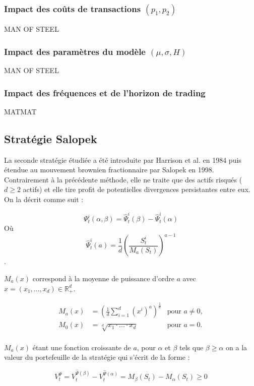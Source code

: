 \documentclass[12pt,a4paper]{article}
\begin{document}
\subsubsection{Impact des coûts de transactions $(p_1, p_2)$}\label{subsubsec:strategieshiryaevfees}
MAN OF STEEL
\subsubsection{Impact des paramètres du modèle $(\mu, \sigma, H)$}\label{subsubsec:strategieshiryaevmodelparam}
MAN OF STEEL

\subsubsection{Impact des fréquences et de l'horizon de trading}\label{subsubsec:strategieshiryaevhorizon}
MATMAT
\subsection{Stratégie Salopek}\label{subsec:strategiesalopek}

La seconde stratégie étudiée a été introduite par Harrison et al. en 1984 puis étendue au mouvement brownien fractionnaire par Salopek en 1998. Contrairement à la précédente méthode, elle ne traite que des actifs risqués ($d\geq2$ actifs) et elle tire profit de potentielles divergences persistantes entre eux. On la décrit comme suit :

\[\Psi_{t}^{i}(\alpha,\beta) = \widehat{\Psi}_{t}^{i}(\beta) - \widehat{\Psi}_{t}^{i}(\alpha)\]
Où 
\[\widehat{\Psi}_{t}^{i}(a) = \frac{1}{d}\left(\frac{S_{t}^{i}}{M_{a}(S_{t})} \right)^{a-1} \].

$M_{a}(x)$ correspond à la moyenne de puissance d'ordre $a$ avec $x = (x_{1},\ldots,x_{d}) \in \mathbb{R}^{d}_{+}$.

\begin{align*}
    M_{a}(x) &= \left(\frac{1}{d}\sum_{i=1}^{d} (x^{i})^{a}\right)^{\frac{1}{a}} & \text{pour } a \neq 0, \\
    M_{0}(x) &= \sqrt[d]{x_{1} \cdot \ldots \cdot x_{d}} & \text{pour } a = 0.
\end{align*} \\

$M_{a}(x)$ étant une fonction croissante de $a$, pour $\alpha$ et $\beta$ tels que $\beta \geq \alpha$ on a la valeur du portefeuille de la stratégie qui s'écrit de la forme :

\[
V^{\Psi}_t = V^{\widehat{\Psi}(\beta)}_{t} - V^{\widehat{\Psi}(\alpha)}_{t} = M_{\beta}(S_{t}) - M_{\alpha}(S_{t}) \geq 0
\] \\
\end{document}
